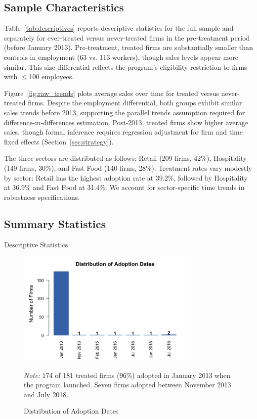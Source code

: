 \documentclass{article}
\newcommand{\note}[1]{%
  \vspace{-0.5em}
  \caption*{\small \textit{Note:} #1}
}
\begin{document}
\subsection{Sample Characteristics}

Table~\ref{tab:descriptives} reports descriptive statistics for the full sample and separately for ever-treated versus never-treated firms in the pre-treatment period (before January 2013). Pre-treatment, treated firms are substantially smaller than controls in employment (63 vs. 113 workers), though sales levels appear more similar. This size differential reflects the program's eligibility restriction to firms with $\leq$100 employees.

Figure~\ref{fig:raw_trends} plots average sales over time for treated versus never-treated firms. Despite the employment differential, both groups exhibit similar sales trends before 2013, supporting the parallel trends assumption required for difference-in-differences estimation. Post-2013, treated firms show higher average sales, though formal inference requires regression adjustment for firm and time fixed effects (Section~\ref{sec:strategy}).

The three sectors are distributed as follows: Retail (209 firms, 42\%), Hospitality (149 firms, 30\%), and Fast Food (140 firms, 28\%). Treatment rates vary modestly by sector: Retail has the highest adoption rate at 39.2\%, followed by Hospitality at 36.9\% and Fast Food at 31.4\%. We account for sector-specific time trends in robustness specifications.

\subsection{Summary Statistics}

\begin{table}[htbp]
\centering
\caption{Descriptive Statistics}
\label{tab:descriptives}

\end{table}

\begin{figure}[htbp]
\centering
\includegraphics[width=0.8\textwidth]{adoption_timing.png}
\caption{Distribution of Adoption Dates}
\label{fig:adoption_timing}
\note{174 of 181 treated firms (96\%) adopted in January 2013 when the program launched. Seven firms adopted between November 2013 and July 2018.}
\end{figure}
\end{document}
